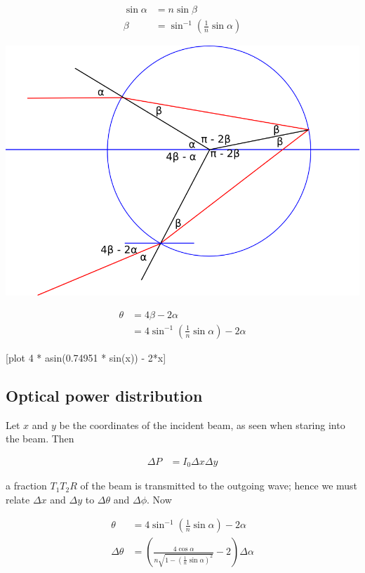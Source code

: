 \documentclass{article}
\newcommand{\D}{\Delta}
\begin{document}
\begin{align*}
\sin\alpha &= n\sin\beta \\
\beta &= \sin^{-1}(\frac{1}{n} \sin\alpha)
\end{align*}

\includegraphics[width=\textwidth]{drawing.png}

\begin{align*}
\theta &= 4\beta - 2\alpha \\
&= 4 \sin^{-1}(\frac{1}{n} \sin\alpha) - 2\alpha
\end{align*}

[plot 4 * asin(0.74951 * sin(x)) - 2*x]

\subsection{Optical power distribution}

Let $x$ and $y$ be the coordinates of the incident beam, as seen when staring into the beam. Then

\begin{align*}
\D P &= I_0 \D x \D y
\end{align*}

a fraction $T_1 T_2 R$ of the beam is transmitted to the outgoing wave; hence we must relate $\D x$ and $\D y$ to $\D \theta$ and $\D \phi$. Now

\begin{align*}
\theta &= 4 \sin^{-1}(\frac{1}{n} \sin\alpha) - 2\alpha \\
\D\theta &= \left(\frac{4\cos\alpha}{n\sqrt{1 - (\frac{1}{n} \sin\alpha)^2}} - 2\right)\D\alpha
\end{align*}
\end{document}
